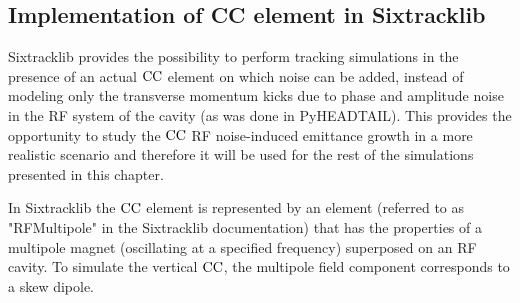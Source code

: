 


\subsection{Implementation of CC element in Sixtracklib}\label{subsec:sixtracklig_CC_implementation}
Sixtracklib provides the possibility to perform tracking simulations in the presence of an actual ${\mathrm{CC}}$ element on which noise can be added, instead of modeling only the transverse momentum kicks due to phase and amplitude noise in the RF system of the cavity (as was done in PyHEADTAIL). This provides the opportunity to study the ${\mathrm{CC}}$ RF noise-induced emittance growth in a more realistic scenario and therefore it will be used for the rest of the simulations presented in this chapter.

In Sixtracklib the ${\mathrm{CC}}$ element is represented by an element (referred to as "RFMultipole" in the Sixtracklib documentation) that has the properties of a multipole magnet (oscillating at a specified frequency) superposed on an RF cavity.  To simulate the vertical ${\mathrm{CC}}$, the multipole field component corresponds to a skew dipole.

